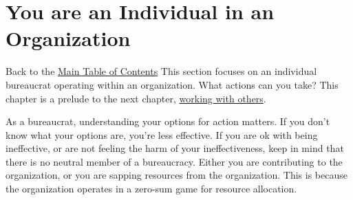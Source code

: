\documentclass[openright]{book}
\begin{document}
\chapter{You are an Individual in an Organization\label{sec:individual-in-org}}
  {\footnotesize Back to the \hyperref[sec:toc]{Main Table of Contents}}
  \minitoc
    This section focuses on an individual bureaucrat operating within an organization. What actions can you take?  This chapter is a prelude to the next chapter, 
    \hyperref[sec:working-with-other-bureaucrats]{working with others}.
    
    As a bureaucrat, understanding your options for action matters. If you don't know what your options are, you're less effective. If you are ok with being ineffective, or are not feeling the harm of your ineffectiveness, keep in mind that
    there is no neutral member of a bureaucracy. Either you are contributing to the organization, or you are sapping resources from the organization. This is because the organization operates in a zero-sum game for resource allocation.

     \clearpage
     \clearpage
     \clearpage
     \clearpage
     \clearpage
     \clearpage
     \clearpage

     \clearpage
     \clearpage
     \clearpage
     \clearpage %
     \clearpage

 \clearpage %
     \clearpage
     \clearpage
     \clearpage
     \clearpage
     \clearpage
     
    \clearpage
     \clearpage
     \clearpage
     \clearpage

 \clearpage %
     \clearpage %
     \clearpage %
     \clearpage %
     \clearpage %
     \clearpage %
     \clearpage 
    
\end{document}
